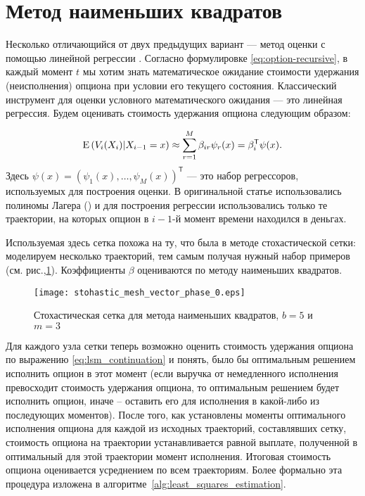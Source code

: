 
\section{Метод наименьших квадратов} %
\label{sec:classic_approaches:least_squares}

Несколько отличающийся от двух предыдущих вариант --- метод оценки с помощью линейной регрессии \cite{Longstaff2001}. Согласно формулировке \eqref{eq:option-recursive}, в каждый момент $t$ мы хотим знать математическое ожидание стоимости удержания (неисполнения) опциона при условии его текущего состояния. Классический инструмент для оценки условного математического ожидания --- это линейная регрессия. Будем оценивать стоимость удержания опциона следующим образом:

\begin{equation}\label{eq:lsm_continuation}
\mathrm{E}\left(V_i(X_i)\middle\vert X_{i-1} = x\right) \approx \sum_{r=1}^M \beta_{ir} \psi_r(x) = \beta_i^\mathsf{T}\psi(x).
\end{equation}
Здесь $\psi(x) = \left(\psi_1(x), \dots, \psi_M(x)\right)^\mathsf{T}$ --- это набор регрессоров, используемых для построения оценки. В оригинальной статье использовались полиномы Лагера (\cite[секция~2.2 на стр.~122]{Longstaff2001}) и для построения регрессии использовались только те траектории, на которых опцион в $i-1$-й момент времени находился в деньгах.

Используемая здесь сетка похожа на ту, что была в методе стохастической сетки: моделируем несколько траекторий, тем самым получая нужный набор примеров (см. рис.,\ref{fig:least_squares}). Коэффициенты $\beta$ оцениваются по методу наименьших квадратов. 

\begin{figure}[t]
    \centering
    \texttt{[image: stohastic\_mesh\_vector\_phase\_0.eps]}
    \caption{Стохастическая сетка для метода наименьших квадратов, $b = 5$ и $m = 3$}
    \label{fig:least_squares}
\end{figure}

Для каждого узла сетки теперь возможно оценить стоимость удержания опциона по выражению \eqref{eq:lsm_continuation} и понять, было бы оптимальным решением исполнить опцион в этот момент (если выручка от немедленного исполнения превосходит стоимость удержания опциона, то оптимальным решением будет исполнить опцион, иначе -- оставить его для исполнения в какой-либо из последующих моментов). После того, как установлены моменты оптимального исполнения опциона для каждой из исходных траекторий, составлявших сетку, стоимость опциона на траектории устанавливается равной выплате, полученной в оптимальный для этой траектории момент исполнения. Итоговая стоимость опциона оценивается усреднением по всем траекториям. Более формально эта процедура изложена в алгоритме~\ref{alg:least_squares_estimation}.

